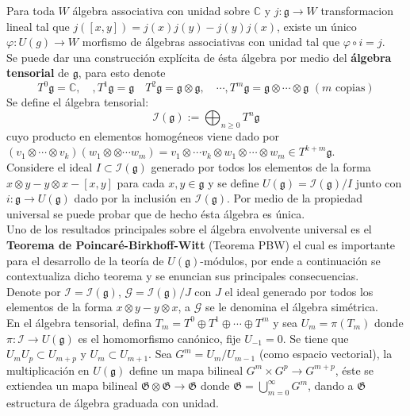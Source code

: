 \documentclass[11pt,a4paper]{article}
\newcommand{\mfg}{\mathfrak{g}}
\begin{document}
Para toda $W$  álgebra associativa con unidad sobre $\mathbb{C}$  y $j: \mfg \rightarrow W$ transformacion lineal tal que $j([x,y])= j(x)j(y)-j(y)j(x)$, existe un \'unico $\varphi: U(g) \rightarrow W$ morfismo de \'algebras associativas con unidad tal que $\varphi \circ i = j$. \\

Se puede dar una construcción explícita de ésta álgebra por medio del \textbf{álgebra tensorial} de $\mfg$, para esto denote
$$T^0\mfg=\mathbb{C}, \, \, \, \,  \, \, , T^{1}\mfg = \mfg \, \, \, \, \, \, T^2 \mfg =\mfg \otimes \mfg, \, \, \, \, \, \, \cdots, T^m \mfg =\mfg \otimes \cdots \otimes \mfg  \, \, (\mbox{$m$ copias}) $$
Se define el álgebra tensorial: 
$$\mathcal{I}(\mfg) := \bigoplus_{n\geq 0}T^n \mfg $$
cuyo producto en elementos homogéneos viene dado por $(v_1 \otimes \cdots \otimes v_k) (w_1 \otimes \otimes \cdots w_m)= v_1\otimes \cdots v_k \otimes w_1 \otimes \cdots \otimes w_m \in T^{k+m}\mfg$. \\
Considere el ideal $I\subset \mathcal{I}(\mfg)$ generado por todos los elementos de la forma $x\otimes y - y\otimes x - [x,y]$ para cada $x,y \in \mfg$ y se define $U(\mfg) = \mathcal{I}(\mfg) / I$ junto con $i: \mfg \rightarrow U(\mfg)$ dado por la inclusión en $\mathcal{I}(\mfg)$. Por medio de la propiedad universal se puede probar que de hecho ésta álgebra es única. \\

Uno de los resultados principales sobre el álgebra envolvente universal es el \textbf{Teorema de Poincaré-Birkhoff-Witt} (Teorema PBW) el cual es importante para el desarrollo de la teoría de $U(\mfg)$-módulos, por ende a continuación se contextualiza dicho teorema y se enuncian sus principales consecuencias. \\

Denote por $\mathcal{I}= \mathcal{I}(\mfg)$, $\mathcal{G}= \mathcal{I}(\mfg) /J$ con $J$ el ideal generado por todos los elementos de la forma $x\otimes y - y \otimes x$, a $\mathcal{G}$ se le denomina el álgebra simétrica. \\

En el álgebra tensorial, defina $T_m= T^0 \oplus T^1 \oplus \cdots \oplus T^m$ y sea $U_m= \pi (T_m)$ donde $\pi:\mathcal{I}\rightarrow U (\mfg)$ es el homomorfismo canónico, fije $U_{-1}=0$. Se tiene que $U_m U_p \subset U_{m+p}$ y $U_m \subset U_{m+1}$. Sea $G^m= U_m/U_{m-1}$ (como espacio vectorial), la multiplicación en $U(\mfg)$ define un mapa bilineal $G^m \times G^p \rightarrow G^{m+p}$, éste se extiendea un mapa bilineal $\mathfrak{G}\otimes \mathfrak{G}\rightarrow \mathfrak{G}$ donde $\mathfrak{G}= \displaystyle \bigcup_{m=0}^\infty G^m$, dando a $\mathfrak{G}$ estructura de álgebra graduada con unidad.\\
\end{document}
